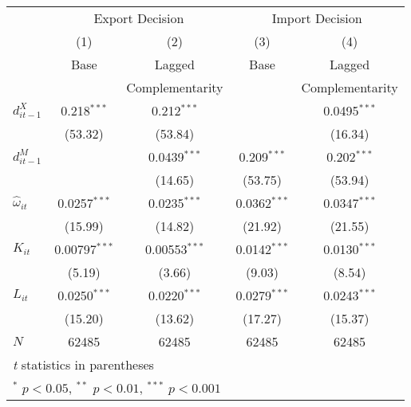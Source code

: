 \begin{center}
\begin{tabular}{l*{4}{c}}
\hline\hline&\multicolumn{2}{c}{Export
              Decision}&\multicolumn{2}{c}{Import Decision}\\
            &\multicolumn{1}{c}{(1)}&\multicolumn{1}{c}{(2)}&\multicolumn{1}{c}{(3)}&\multicolumn{1}{c}{(4)}\\
            &\multicolumn{1}{c}{Base}&\multicolumn{1}{c}{Lagged}&\multicolumn{1}{c}{Base}&\multicolumn{1}{c}{Lagged}\\
&\multicolumn{1}{c}{}&\multicolumn{1}{c}{Complementarity}&\multicolumn{1}{c}{}&\multicolumn{1}{c}{Complementarity}\\

      
\hline
$d_{it-1}^{X}$      &       0.218$^{***}$&       0.212$^{***}$&                     &      0.0495$^{***}$\\
            &     (53.32)         &     (53.84)         &                     &     (16.34)         \\
$d_{it-1}^{M}$      &                     &      0.0439$^{***}$&       0.209$^{***}$&       0.202$^{***}$\\
            &                     &     (14.65)         &     (53.75)
                                                                                    &     (53.94)         \\
$\hat{\omega}_{it}$       &      0.0257$^{***}$&      0.0235$^{***}$&      0.0362$^{***}$&      0.0347$^{***}$\\
            &     (15.99)         &     (14.82)         &     (21.92)         &     (21.55)         \\

$K_{it}$        &     0.00797$^{***}$&     0.00553$^{***}$&      0.0142$^{***}$&      0.0130$^{***}$\\
            &      (5.19)         &      (3.66)         &      (9.03)         &      (8.54)         \\

$L_{it}$     &      0.0250$^{***}$&      0.0220$^{***}$&      0.0279$^{***}$&      0.0243$^{***}$\\
            &     (15.20)         &     (13.62)         &     (17.27)         &     (15.37)         \\
\hline
\(N\)       &       62485         &       62485         &       62485         &       62485         \\
\hline\hline
\multicolumn{5}{l}{\footnotesize \textit{t} statistics in parentheses}\\
\multicolumn{5}{l}{\footnotesize $^{*}$ \(p<0.05\), $^{**}$ \(p<0.01\), $^{***}$ \(p<0.001\)}\\
\end{tabular}
\end{center}
